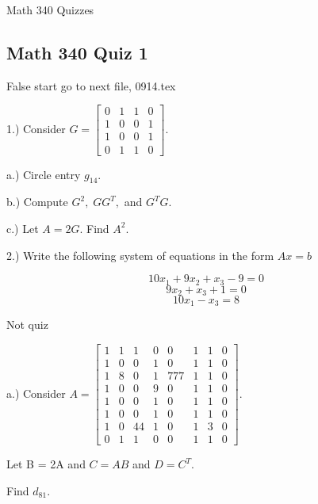 \documentclass{article}
\begin{document}
Math 340 Quizzes

\subsection*{Math 340 Quiz 1}


False start go to next file, 0914.tex



1.) Consider $G=\left[\begin{array}{cccc}
0 & 1 & 1 & 0\\
1 & 0 & 0 & 1\\
1 & 0 & 0 & 1\\
0 & 1 & 1 & 0
\end{array}\right]$.


a.) Circle entry $g_{14}$.

b.) Compute $G^2,\; GG^T,$ and $G^TG$.

c.) Let $A=2G$. Find $A^2$.
\bigskip


2.) Write the following system of equations in the form $Ax = b$

$$10x_1+9x_2+x_3-9=0$$
$$9x_2+x_3+1=0$$
$$10x_1 - x_3=8$$


\pagebreak
Not quiz 


a.) Consider $A=\left[\begin{array}{cccccccc}
1 & 1 & 1 & 0 & 0 & 1 & 1 & 0\\
1 & 0 & 0 & 1& 0 & 1 & 1 & 0\\
1 & 8 & 0 & 1 & 777 & 1 & 1 & 0\\
1 & 0 & 0 & 9 & 0 & 1 & 1 & 0\\
1 & 0 & 0 & 1 & 0 & 1 & 1 & 0\\
1 & 0 & 0 & 1 & 0 & 1 & 1 & 0\\
1 & 0 & 44 & 1 & 0 & 1 & 3 & 0\\
0 & 1 & 1 & 0 &0 & 1 & 1 & 0
\end{array}\right]$.

Let B = 2A and $C=AB$ and $D=C^T$.

Find $d_{81}$.
\end{document}

